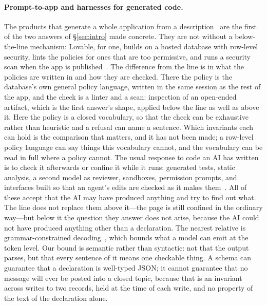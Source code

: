 \documentclass[11pt]{article}
\begin{document}
\paragraph{Prompt-to-app and harnesses for generated code.} The products that generate a whole application from a description~\cite{vibetools2026} are the first of the two answers of \S\ref{sec:intro} made concrete. They are not without a below-the-line mechanism: Lovable, for one, builds on a hosted database with row-level security, lints the policies for ones that are too permissive, and runs a security scan when the app is published~\cite{lovable2026security}. The difference from the line is in what the policies are written in and how they are checked. There the policy is the database's own general policy language, written in the same session as the rest of the app, and the check is a linter and a scan: inspection of an open-ended artifact, which is the first answer's shape, applied below the line as well as above it. Here the policy is a closed vocabulary, so that the check can be exhaustive rather than heuristic and a refusal can name a sentence. Which invariants each can hold is the comparison that matters, and it has not been made; a row-level policy language can say things this vocabulary cannot, and the vocabulary can be read in full where a policy cannot. The usual response to code an AI has written is to check it afterwards or confine it while it runs: generated tests, static analysis, a second model as reviewer, sandboxes, permission prompts, and interfaces built so that an agent's edits are checked as it makes them~\cite{yang2024sweagent}. All of these accept that the AI may have produced anything and try to find out what. The line does not replace them above it---the page is still confined in the ordinary way---but below it the question they answer does not arise, because the AI could not have produced anything other than a declaration. The nearest relative is grammar-constrained decoding~\cite{willard2023outlines,beurerkellner2023lmql,openai2024structured}, which bounds what a model can emit at the token level. Our bound is semantic rather than syntactic: not that the output parses, but that every sentence of it means one checkable thing. A schema can guarantee that a declaration is well-typed JSON; it cannot guarantee that no message will ever be posted into a closed topic, because that is an invariant across writes to two records, held at the time of each write, and no property of the text of the declaration alone.
\end{document}
